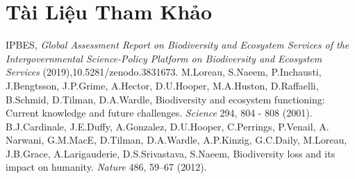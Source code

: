 \documentclass[12pt,a4paper]{article}
\begin{document}
\section{Tài Liệu Tham Khảo}
\begin{thebibliography}{9}
IPBES, \textit{Global Assessment Report on Biodiversity and Ecosystem Services of the Intergovernmental Science-Policy Platform on Biodiversity and Ecosystem Services }(2019),10.5281/zenodo.3831673.
\newpage
{}
M.Loreau, S.Naeem, P.Inchausti, J.Bengtsson, J.P.Grime, A.Hector, D.U.Hooper, M.A.Huston, D.Raffaelli, B.Schmid, D.Tilman, D.A.Wardle, Biodiversity and ecosystem functioning: Current knowledge and future challenges. \textit{Science} 294, 804 - 808 (2001).\\
B.J.Cardinale, J.E.Duffy, A.Gonzalez, D.U.Hooper, C.Perrings, P.Venail, A. Narwani, G.M.MacE, D.Tilman, D.A.Wardle, A.P.Kinzig, G.C.Daily, M.Loreau, J.B.Grace, A.Larigauderie, D.S.Srivastava, S.Naeem, Biodiversity loss and its impact on humanity. \textit{Nature} 486, 59–67 (2012).
\end{thebibliography}
\end{document}
